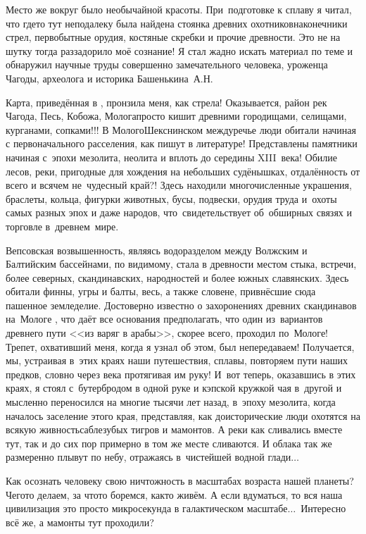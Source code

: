 Место же вокруг было необычайной красоты. При~подготовке к сплаву я читал, что где\sdash то тут неподалеку была найдена стоянка древних охотников\mdash наконечники стрел, первобытные орудия, костяные скребки и прочие древности. Это не на шутку тогда раззадорило моё сознание! Я стал жадно искать материал по теме и обнаружил научные труды совершенно замечательного человека, уроженца Чагоды, археолога и историка Башенькина~А.Н. 

Карта, приведённая в \cite{БашенькинМологоШекснинскоеМеждуречье}, пронзила меня, как стрела! Оказывается, район рек Чагода, Песь, Кобожа, Молога\mdash просто кишит древними городищами, селищами, курганами, сопками!!! В Молого\sdash Шекснинском междуречье люди обитали начиная с первоначального расселения, как пишут в литературе! Представлены памятники начиная с~эпохи мезолита, неолита и вплоть до середины XIII~века! Обилие лесов, реки, пригодные для хождения на небольших судёнышках, отдалённость от всего и вся\mdash чем не~чудесный край?! Здесь находили многочисленные украшения, браслеты, кольца, фигурки животных, бусы, подвески, орудия труда и~охоты самых разных эпох и даже народов, что~свидетельствует об~обширных связях и торговле в~древнем~мире.

Вепсовская возвышенность, являясь водоразделом между Волжским и Балтийским бассейнами, по видимому, стала в древности местом стыка, встречи, более северных, скандинавских, народностей и более южных славянских. Здесь обитали финны, угры и балты, весь, а также словене, привнёсшие сюда пашенное земледелие. Достоверно известно о захоронениях древних скандинавов на~Мологе \cite{БашенькинМологоШекснинскоеМеждуречье}, что даёт все основания предполагать, что один из~вариантов древнего пути <<из варяг в арабы>>, скорее всего, проходил по~Мологе! Трепет, охвативший меня, когда я узнал об этом, был непередаваем! Получается, мы, устраивая в~этих краях наши путешествия, сплавы, повторяем пути наших предков, словно через века протягивая им руку!
\newpage
И~вот теперь, оказавшись в этих краях, я стоял с~бутербродом в одной руке и кэпской кружкой чая в~другой и мысленно переносился на многие тысячи лет назад, в~эпоху мезолита, когда началось заселение этого края, представляя, как доисторические люди охотятся на всякую живность\mdash саблезубых тигров и мамонтов. А реки как сливались вместе тут, так и до сих пор примерно в том же месте сливаются. И облака так же размеренно плывут по небу, отражаясь в~чистейшей водной глади$\ldots$

Как осознать человеку свою ничтожность в масштабах возраста нашей планеты? Чего\sdash то делаем, за что\sdash то боремся, как\sdash то живём. А если вдуматься, то вся наша цивилизация \mdash это просто микросекунда в галактическом масштабе$\ldots$~Интересно всё же, а мамонты тут проходили?

